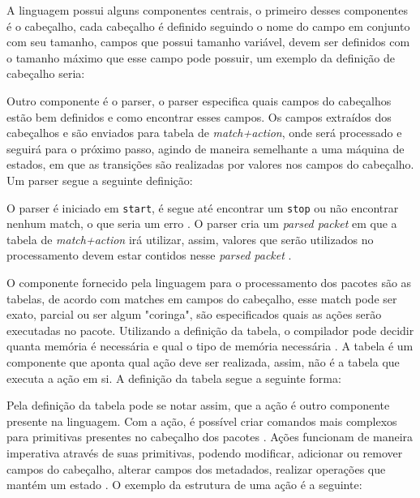 \documentclass[12pt,
openright, 
oneside,
a4paper,
brazil]{facom-ufu-abntex2}
\theoremstyle{definition}
\begin{document}
A linguagem possui alguns componentes centrais,
o primeiro desses componentes é o cabeçalho, cada cabeçalho é definido seguindo 
o nome do campo em conjunto com seu tamanho, campos que possui tamanho variável,
devem ser definidos com o tamanho máximo que esse campo pode possuir, um exemplo
da definição de cabeçalho seria:



Outro componente é o parser, o parser especifica quais campos do cabeçalhos estão
bem definidos e como encontrar esses campos. Os campos extraídos dos cabeçalhos e 
são enviados para tabela de \textit{match+action}, onde será processado e seguirá
para o próximo passo, agindo de maneira semelhante a uma máquina de estados, em 
que as transições são realizadas por valores nos campos do cabeçalho. Um parser
segue a seguinte definição:



O parser é iniciado em \texttt{start}, é segue até encontrar um \texttt{stop} ou não
encontrar nenhum match, o que seria um erro \citep{bosshart2014p4}. O parser cria um 
\textit{parsed packet} em que a tabela de \textit{match+action} irá utilizar,
assim, valores que serão utilizados no processamento devem estar contidos nesse
\textit{parsed packet} \citep{p4USITutorial}.

O componente fornecido pela linguagem para o processamento dos pacotes são as tabelas,
de acordo com matches em campos do cabeçalho, esse match  pode ser exato, parcial 
ou ser algum "coringa", são especificados quais as ações serão executadas no
pacote. Utilizando a definição da tabela, o compilador pode decidir quanta memória 
é necessária e qual o tipo de memória necessária \citep{bosshart2014p4}. A
tabela é um componente que aponta qual ação deve ser realizada, assim, não é a 
tabela que executa a ação em si. A definição da tabela segue a seguinte forma:



Pela definição da tabela pode se notar assim, que a ação é outro componente presente
na linguagem. Com a ação, é possível criar comandos mais complexos para primitivas
presentes no cabeçalho dos pacotes \citep{bosshart2014p4}. Ações funcionam de
maneira imperativa através de suas primitivas, podendo modificar, adicionar ou 
remover campos do cabeçalho, alterar campos dos metadados, realizar operações
que mantém um estado \citep{p4USITutorial}. O exemplo da estrutura de uma ação
é a seguinte:
\end{document}
